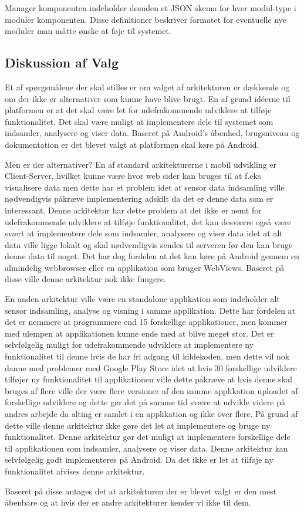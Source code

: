 Manager komponenten indeholder desuden et JSON skema for hver modul-type i moduler komponenten.
Disse definitioner beskriver formatet for eventuelle nye moduler man måtte ønske at føje til systemet.

\subsection{Diskussion af Valg}
Et af spørgsmålene der skal stilles er om valget af arkitekturen er dækkende og om der ikke er alternativer som kunne have blive brugt.
En af grund idéerne til platformen er at det skal være let for udefrakommende udviklere at tilføje funktionalitet. 
Det skal være muligt at implementere dele til systemet som indsamler, analysere og viser data.
Baseret på Android's åbenhed, brugsniveau og dokumentation er det blevet valgt at platformen skal køre på Android.

Men er der alternativer? En af standard arkitekturerne i mobil udvikling er Client-Server, hvilket kunne være hvor web sider kan bruges til at f.eks. visualisere data men dette har et problem idet at sensor data indsamling ville nødvendigvis påkræve implementering adskilt da det er denne data som er interessant.
Denne arkitektur har dette problem at det ikke er nemt for udefrakommende udviklere at tilføje funktionalitet, det kan desværre også være svært at implementere dele som indsamler, analysere og viser data idet at alt data ville ligge lokalt og skal nødvendigvis sendes til serveren før den kan bruge denne data til noget. 
Det har dog fordelen at det kan køre på Android gennem en almindelig webbrowser eller en applikation som bruger WebViews.
Baseret på disse ville denne arkitektur nok ikke fungere.

En anden arkitektur ville være en standalone applikation som indeholder alt sensor indsamling, analyse og visning i samme applikation.
Dette har fordelen at det er nemmere at programmere end 15 forskellige applikationer, men kommer med ulempen at applikationen kunne ende med at blive meget stor.
Det er selvfølgelig muligt for udefrakommende udviklere at implementere ny funktionalitet til denne hvis de har fri adgang til kildekoden, men dette vil nok danne med problemer med Google Play Store idet at hvis 30 forskellige udviklere tilføjer ny funktionalitet til applikationen ville dette påkræve at hvis denne skal bruges af flere ville der være flere versioner af den samme applikation uploadet af forskellige udviklere og dette gør det på samme tid svære at udvikle videre på andres arbejde da alting er samlet i en applikation og ikke over flere.
På grund af dette ville denne arkitektur ikke gøre det let at implementere og bruge ny funktionalitet.
Denne arkitektur gør det muligt at implementere forskellige dele til applikationen som indsamler, analysere og viser data.
Denne arkitektur kan selvfølgelig godt implementeres på Android.
Da det ikke er let at tilføje ny funktionalitet afvises denne arkitektur. 

Baseret på disse antages det at arkitekturen der er blevet valgt er den mest åbenbare og at hvis der er andre arkitekturer kender vi ikke til dem.